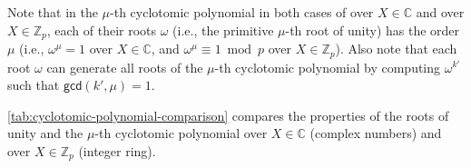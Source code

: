 Note that in the $\mu$-th cyclotomic polynomial in both cases of over $X \in \mathbb{C}$ and over $X \in \mathbb{Z}_p$, each of their roots $\omega$ (i.e., the primitive $\mu$-th root of unity) has the order $\mu$ (i.e., $\omega^{\mu} = 1$ over $X \in \mathbb{C}$, and $\omega^{\mu} \equiv 1 \bmod p$ over $X \in \mathbb{Z}_p$). Also note that each root $\omega$ can generate all roots of the $\mu$-th cyclotomic polynomial by computing $\omega^{k'}$ such that $\textsf{gcd}(k', \mu) = 1$.

\autoref{tab:cyclotomic-polynomial-comparison} compares the properties of the roots of unity and the $\mu$-th cyclotomic polynomial over $X \in \mathbb{C}$ (complex numbers) and over $X \in \mathbb{Z}_p$ (integer ring).






